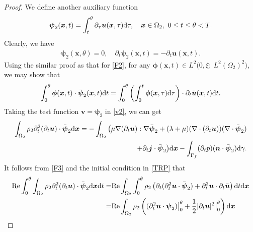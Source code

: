 \documentclass[final,leqno]{siamltex}
\begin{document}
\begin{proof}
We define another auxiliary function
\[
 \boldsymbol \psi_2  (\boldsymbol x, t) = \int_t^{\theta}
\partial_{\tau}\boldsymbol u (\boldsymbol x, \tau) {\rm d} \tau, \quad
\boldsymbol x \in \Omega_2,~~~0 \leq t \leq \theta < T.
\]
Clearly, we have
\begin{align}\label{F3}
 \boldsymbol \psi_2 (\boldsymbol x, \theta) =0, \quad \partial_t  \boldsymbol
\psi_2 (\boldsymbol x, t) = -\partial_t\boldsymbol u (\boldsymbol x, t).
\end{align}
Using the similar proof as that for \eqref{F2},  for any $\boldsymbol \phi
(\boldsymbol x, t) \in L^2 \big(0, \xi;~ L^2 (\Omega_2)^2 \big)$, we may
show that
\begin{align}\label{F4}
 \int_0^{\theta} \boldsymbol \phi (\boldsymbol x, t) \cdot \bar {\boldsymbol
\psi}_2 (\boldsymbol x, t) {\rm d} t=
 \int_0^{\theta} \left( \int_0^t \boldsymbol \phi (\boldsymbol x, \tau) {\rm d}
\tau\right) \cdot  \partial_t\bar { \boldsymbol u} (\boldsymbol x, t) {\rm d} t.
\end{align}
Taking the test function $\boldsymbol v = \boldsymbol \psi_2$ in \eqref{v2}, we
can get
\begin{align}\label{tf2}
 \int_{\Omega_2} \rho_2  \partial_t^2 (\partial_t \boldsymbol u) \cdot \bar
{\boldsymbol \psi}_2 {\rm d} \boldsymbol  x =
 -\int_{\Omega_2} \big( \mu \nabla (\partial_t \boldsymbol u) : \nabla {\bar
{\boldsymbol \psi}}_2 + (\lambda + \mu) (\nabla \cdot (\partial_t\boldsymbol u))
(\nabla \cdot \bar {\boldsymbol \psi}_2)\notag\\
+ \partial_t  \boldsymbol j \cdot \bar {\boldsymbol \psi}_2 \big) {\rm d}
\boldsymbol x-\int_{\Gamma_f} (\partial_t p) (\boldsymbol n \cdot \bar {
\boldsymbol \psi}_2) {\rm d} \gamma.
\end{align}
It follows from \eqref{F3}  and the initial condition in \eqref {TRP} that
\begin{align*}
 {\rm Re} \int_0^{\theta} \int_{\Omega_2}
 \rho_2 \partial_t^2  ( \partial_t \boldsymbol u) \cdot \bar {\boldsymbol \psi
}_2 {\rm d} \boldsymbol  x  {\rm d} t
 =&{\rm Re} \int_{\Omega_2} \int_0^{\theta} \rho_2 \left( \partial_t
(\partial^2_t \boldsymbol u  \cdot \bar {\boldsymbol \psi}_2)
 +\partial^2_t \boldsymbol u \cdot \partial_t\bar {\boldsymbol u} \right) {\rm
d} t{\rm d} \boldsymbol x \\
 =& {\rm Re} \int_{\Omega_2} \rho_2\left(  (\partial^2_t \boldsymbol u \cdot
\bar {\boldsymbol \psi}_2 ) \big|_{0}^{\theta}+
 \frac{1}{2 } |\partial_t \boldsymbol u|^2  \big|_0^{\theta}\right) {\rm d}
\boldsymbol x \\

\end{align*}
\end{proof}
\end{document}
